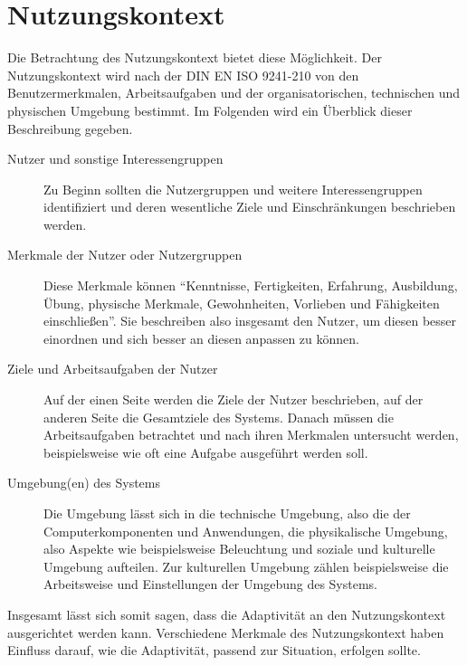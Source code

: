 \documentclass[12pt, paper=a4, bibtotoc, toc=listof, headsepline=true]{scrreprt}
\begin{document}
	\section{Nutzungskontext}
	Die Betrachtung des Nutzungskontext bietet diese Möglichkeit. Der Nutzungskontext wird nach der DIN EN ISO 9241-210 von den Benutzermerkmalen, Arbeitsaufgaben und der organisatorischen, technischen und physischen Umgebung bestimmt. Im Folgenden wird ein Überblick dieser Beschreibung gegeben\cite[S.15 ff.]{hoffmann2014venus}.
	\begin{description}  
		\item  [Nutzer und sonstige Interessengruppen] 
		Zu Beginn sollten die Nutzergruppen und weitere Interessengruppen identifiziert und deren wesentliche Ziele und Einschränkungen beschrieben werden.
			
		\item [Merkmale der Nutzer oder Nutzergruppen]
		Diese Merkmale können \enquote{Kenntnisse, Fertigkeiten, Erfahrung, Ausbildung, Übung, physische Merkmale, Gewohnheiten, Vorlieben und Fähigkeiten einschließen}\cite[S.16 ]{hoffmann2014venus}. Sie beschreiben also insgesamt den Nutzer, um diesen besser einordnen und sich besser an diesen anpassen zu können.
		
		\item  [Ziele und Arbeitsaufgaben der Nutzer]
		Auf der einen Seite werden die Ziele der Nutzer beschrieben, auf der anderen Seite die Gesamtziele des Systems. Danach müssen die Arbeitsaufgaben betrachtet und nach ihren Merkmalen untersucht werden, beispielsweise wie oft eine Aufgabe ausgeführt werden soll.
			
		\item [Umgebung(en) des Systems]
		Die Umgebung lässt sich in die technische Umgebung, also die der Computerkomponenten und Anwendungen, die physikalische Umgebung, also Aspekte wie beispielsweise Beleuchtung und soziale und kulturelle Umgebung aufteilen. Zur kulturellen Umgebung zählen beispielsweise die Arbeitsweise und Einstellungen der Umgebung des Systems.
	\end{description}
	Insgesamt lässt sich somit sagen, dass die Adaptivität an den Nutzungskontext ausgerichtet werden kann. Verschiedene Merkmale des Nutzungskontext haben Einfluss darauf, wie die Adaptivität, passend zur Situation, erfolgen sollte.
\end{document}
